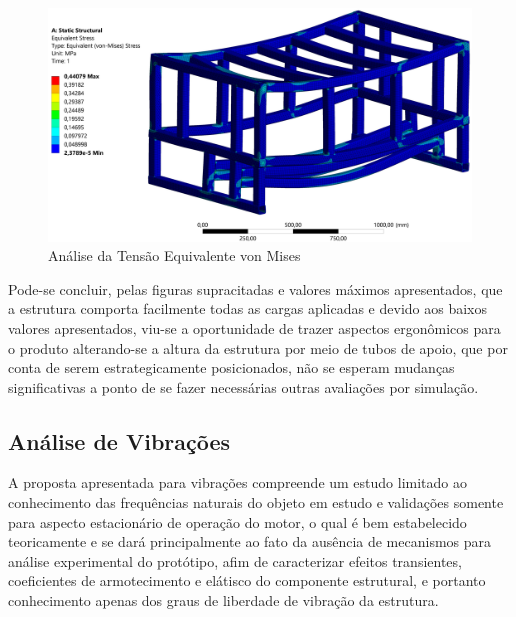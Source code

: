 
\begin{figure}[ht]
    \centering
    \includegraphics[width=1\textwidth]{figuras/estrutura/AnaliseEstaticaTubular/Von-Mises Stress_Tubular.png}
    \caption{Análise da Tensão Equivalente von Mises}
    \label{fig:Von_Mises_tubular}
\end{figure}

Pode-se concluir, pelas figuras supracitadas e valores máximos apresentados, que a estrutura comporta facilmente todas as cargas aplicadas e devido aos baixos valores apresentados, viu-se a oportunidade de trazer aspectos ergonômicos para o produto alterando-se a altura da estrutura por meio de tubos de apoio, que por conta de serem estrategicamente posicionados, não se esperam mudanças significativas a ponto de se fazer necessárias outras avaliações por simulação.


\subsection{Análise de Vibrações} \label{section:AnaliseVibracoes}
A proposta apresentada para vibrações compreende um estudo limitado ao conhecimento das frequências naturais do objeto em estudo e validações somente para aspecto estacionário de operação do motor, o qual é bem estabelecido teoricamente e se dará principalmente ao fato da ausência de mecanismos para análise experimental do protótipo, afim de caracterizar efeitos transientes, coeficientes de armotecimento e elátisco do componente estrutural, e portanto conhecimento apenas dos graus de liberdade de vibração da estrutura.

